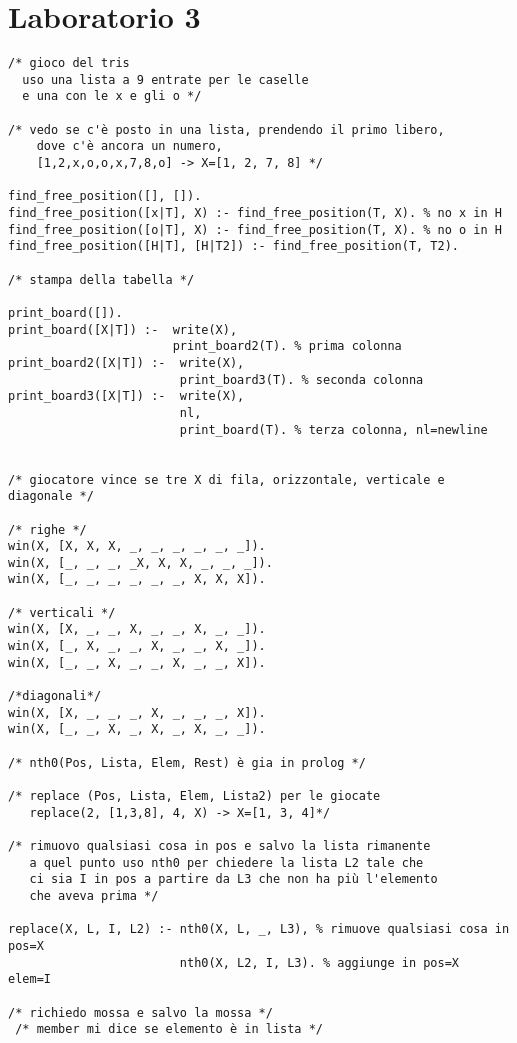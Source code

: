 \documentclass[a4paper,12pt, oneside]{book}
\begin{document}
\newpage
\section{Laboratorio 3}
\begin{esercizio}
\begin{verbatim}
/* gioco del tris
  uso una lista a 9 entrate per le caselle
  e una con le x e gli o */

/* vedo se c'è posto in una lista, prendendo il primo libero,
    dove c'è ancora un numero,
    [1,2,x,o,o,x,7,8,o] -> X=[1, 2, 7, 8] */

find_free_position([], []).
find_free_position([x|T], X) :- find_free_position(T, X). % no x in H
find_free_position([o|T], X) :- find_free_position(T, X). % no o in H
find_free_position([H|T], [H|T2]) :- find_free_position(T, T2).

/* stampa della tabella */

print_board([]).
print_board([X|T]) :-  write(X),
                       print_board2(T). % prima colonna
print_board2([X|T]) :-  write(X),
                        print_board3(T). % seconda colonna
print_board3([X|T]) :-  write(X),
                        nl,
                        print_board(T). % terza colonna, nl=newline


/* giocatore vince se tre X di fila, orizzontale, verticale e diagonale */

/* righe */
win(X, [X, X, X, _, _, _, _, _, _]).
win(X, [_, _, _, _X, X, X, _, _, _]).
win(X, [_, _, _, _, _, _, X, X, X]).

/* verticali */
win(X, [X, _, _, X, _, _, X, _, _]).
win(X, [_, X, _, _, X, _, _, X, _]).
win(X, [_, _, X, _, _, X, _, _, X]).

/*diagonali*/
win(X, [X, _, _, _, X, _, _, _, X]).
win(X, [_, _, X, _, X, _, X, _, _]).

/* nth0(Pos, Lista, Elem, Rest) è gia in prolog */

/* replace (Pos, Lista, Elem, Lista2) per le giocate
   replace(2, [1,3,8], 4, X) -> X=[1, 3, 4]*/

/* rimuovo qualsiasi cosa in pos e salvo la lista rimanente
   a quel punto uso nth0 per chiedere la lista L2 tale che 
   ci sia I in pos a partire da L3 che non ha più l'elemento
   che aveva prima */

replace(X, L, I, L2) :- nth0(X, L, _, L3), % rimuove qualsiasi cosa in pos=X
                        nth0(X, L2, I, L3). % aggiunge in pos=X  elem=I

/* richiedo mossa e salvo la mossa */
 /* member mi dice se elemento è in lista */
 

\end{verbatim}
\end{esercizio}
\end{document}
